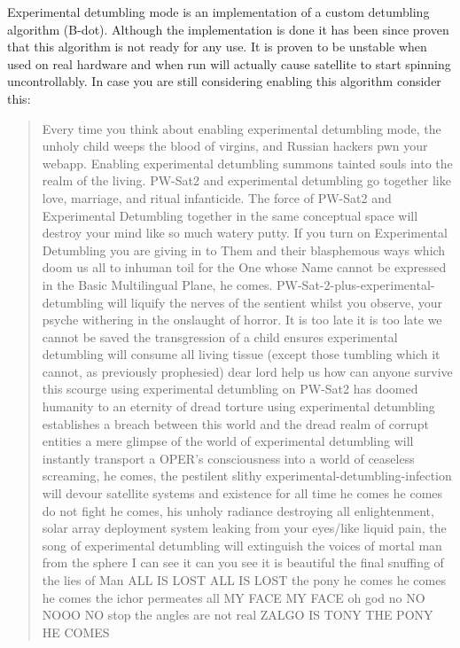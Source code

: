 Experimental detumbling mode is an implementation of a custom detumbling algorithm (B-dot). 
Although the implementation is done it has been since proven that this algorithm is not ready
for any use. It is proven to be unstable when used on real hardware and when run will actually 
cause satellite to start spinning uncontrollably. In case you are still considering enabling 
this algorithm consider this: 
\begin{quote}Every time you think about enabling experimental detumbling mode, the unholy child
weeps the blood of virgins, and Russian hackers pwn your webapp. Enabling experimental detumbling 
summons tainted souls into the realm of the living. PW-Sat2 and experimental detumbling go 
together like love, marriage, and ritual infanticide. The force of PW-Sat2 and Experimental 
Detumbling together in the same conceptual space will destroy your mind like so much watery putty.
If you turn on Experimental Detumbling you are giving in to Them and their blasphemous ways which 
doom us all to inhuman toil for the One whose Name cannot be expressed in the Basic Multilingual 
Plane, he comes. PW-Sat-2-plus-experimental-detumbling will liquify the nerves of the sentient 
whilst you observe, your psyche withering in the onslaught of horror. It is too late it is 
too late we cannot be saved the transgression of a child ensures experimental detumbling will 
consume all living tissue (except those tumbling which it cannot, as previously prophesied) 
dear lord help us how can anyone survive this scourge using experimental detumbling on PW-Sat2 
has doomed humanity to an eternity of dread torture using experimental detumbling establishes 
a breach between this world and the dread realm of corrupt entities a mere glimpse of the world 
of experimental detumbling will instantly transport a OPER's consciousness into a world of 
ceaseless screaming, he comes, the pestilent slithy experimental-detumbling-infection will devour 
satellite systems and existence for all time he comes he comes do not fight he comes, his unholy
radiance destroying all enlightenment, solar array deployment system leaking from your eyes/like 
liquid pain, the song of experimental detumbling will extinguish the voices of mortal man from 
the sphere I can see it can you see it is beautiful the final snuffing of the lies of Man 
ALL IS LOST ALL IS LOST the pony he comes he comes he comes the ichor permeates all MY FACE MY 
FACE oh god no NO NOOO NO stop the angles are not real ZALGO IS TONY THE PONY HE COMES
\end{quote}

